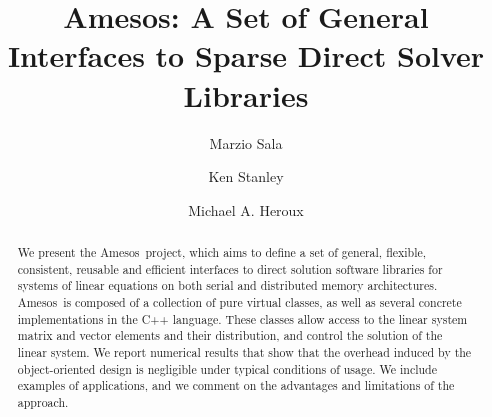 \documentclass{llncs}
\newcommand{\amesos}{{\sc Amesos}}
\begin{document}
\pagestyle{headings} 
\mainmatter              %


\title{\amesos: A Set of General Interfaces to Sparse Direct Solver Libraries}
%
%
\author{Marzio Sala \and Ken Stanley \and
Michael A. Heroux}
%
%
%

\maketitle              %

\begin{abstract}
We present the \amesos\ project, which aims to define a set of general,
flexible, consistent, reusable and efficient interfaces to direct solution
software libraries for systems of linear equations on both serial and
distributed memory architectures. \amesos\ is composed of a collection of pure
virtual classes, as well as several concrete implementations in the C++
language. These classes allow access to the linear system matrix and vector
elements and their distribution, and control the solution of the linear
system. We report numerical results that show that the overhead induced by the
object-oriented design is negligible under typical conditions of usage. We
include examples of applications, and we comment on the advantages and
limitations of the approach.
\end{abstract}
\end{document}
